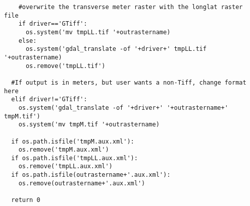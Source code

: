 \begin{verbatim}
    #overwrite the transverse meter raster with the longlat raster file
    if driver=='GTiff':
      os.system('mv tmpLL.tif '+outrastername)
    else:
      os.system('gdal_translate -of '+driver+' tmpLL.tif '+outrastername)
      os.remove('tmpLL.tif')
  
  #If output is in meters, but user wants a non-Tiff, change format here
  elif driver!='GTiff':
    os.system('gdal_translate -of '+driver+' '+outrastername+' tmpM.tif')
    os.system('mv tmpM.tif '+outrastername)
  
  if os.path.isfile('tmpM.aux.xml'):
    os.remove('tmpM.aux.xml')
  if os.path.isfile('tmpLL.aux.xml'):
    os.remove('tmpLL.aux.xml')
  if os.path.isfile(outrastername+'.aux.xml'):
    os.remove(outrastername+'.aux.xml')
  
  return 0
\end{verbatim}

